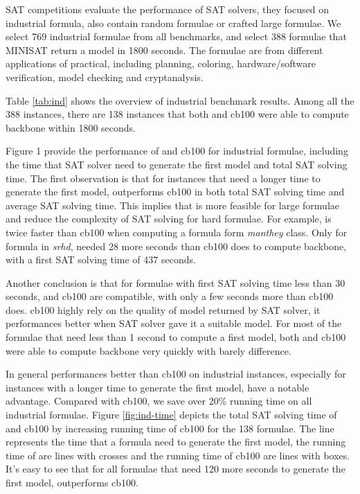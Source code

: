 SAT competitions evaluate the performance of SAT solvers, they focused on industrial formula, also contain random formulae or crafted large formulae. We select 769 industrial formulae from all benchmarks, and select 388 formulae that MINISAT return a model in 1800 seconds. The formulae are from different applications of practical, including planning, coloring, hardware/software verification, model checking and cryptanalysis.

Table \ref{tab:ind} shows the overview of industrial benchmark results. Among all the 388 instances, there are 138 instances that both \tool and cb100 were able to compute backbone within 1800 seconds.

Figure 1 provide the performance of \tool and cb100 for industrial formulae, including the time that SAT solver need to generate the first model and total SAT solving time. The first observation is that for instances that need a longer time to generate the first model, \tool outperforms cb100 in both total SAT solving time and average SAT solving time. This implies that \tool is more feasible for large formulae and reduce the complexity of SAT solving for hard formulae. For example, \tool is twice faster than cb100 when computing a formula form \emph{manthey} class. Only for formula in \emph{srhd}, \tool needed 28 more seconds than cb100 does to compute backbone, with a first SAT solving time of 437 seconds.

Another conclusion is that for formulae with first SAT solving time less than 30 seconds, \tool and cb100 are compatible, with only a few seconds more than cb100 does. cb100 highly rely on the quality of model returned by SAT solver, it performances better when SAT solver gave it a suitable model. For most of the formulae that need less than 1 second to compute a first model, both \tool and cb100 were able to compute backbone very quickly with barely difference.

In general \tool performances better than cb100 on industrial instances, especially for instances with a longer time to generate the first model, \tool have a notable advantage. Compared with cb100, we save over 20\% running time on all industrial formulae. Figure \ref{fig:ind-time} depicts the total SAT solving time of \tool and cb100 by increasing running time of cb100 for the 138 formulae. The line represents the time that a formula need to generate the first model, the running time of \tool are lines with crosses and the running time of cb100 are lines with boxes. It's easy to see that for all formulae that need 120 more seconds to generate the first model, \tool outperforms cb100.

